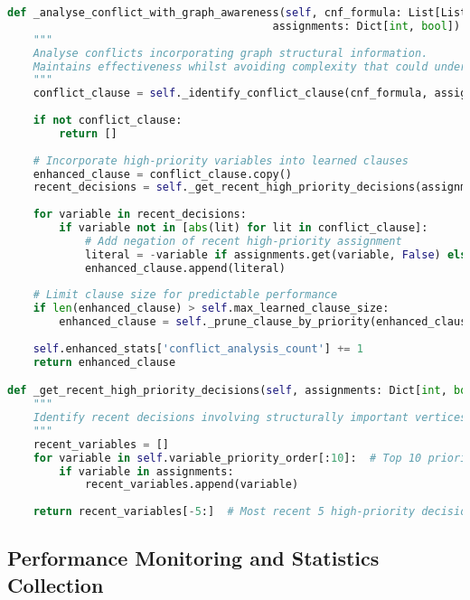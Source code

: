 \begin{lstlisting}[language=Python, caption=Graph-Aware Conflict Analysis with Robustness Guarantees]
def _analyse_conflict_with_graph_awareness(self, cnf_formula: List[List[int]], 
                                         assignments: Dict[int, bool]) -> List[int]:
    """
    Analyse conflicts incorporating graph structural information.
    Maintains effectiveness whilst avoiding complexity that could undermine robustness.
    """
    conflict_clause = self._identify_conflict_clause(cnf_formula, assignments)
    
    if not conflict_clause:
        return []
    
    # Incorporate high-priority variables into learned clauses
    enhanced_clause = conflict_clause.copy()
    recent_decisions = self._get_recent_high_priority_decisions(assignments)
    
    for variable in recent_decisions:
        if variable not in [abs(lit) for lit in conflict_clause]:
            # Add negation of recent high-priority assignment
            literal = -variable if assignments.get(variable, False) else variable
            enhanced_clause.append(literal)
    
    # Limit clause size for predictable performance
    if len(enhanced_clause) > self.max_learned_clause_size:
        enhanced_clause = self._prune_clause_by_priority(enhanced_clause)
    
    self.enhanced_stats['conflict_analysis_count'] += 1
    return enhanced_clause

def _get_recent_high_priority_decisions(self, assignments: Dict[int, bool]) -> List[int]:
    """
    Identify recent decisions involving structurally important vertices.
    """
    recent_variables = []
    for variable in self.variable_priority_order[:10]:  # Top 10 priority variables
        if variable in assignments:
            recent_variables.append(variable)
    
    return recent_variables[-5:]  # Most recent 5 high-priority decisions
\end{lstlisting}

\subsection{Performance Monitoring and Statistics Collection}
\label{appendix:performance-monitoring}

